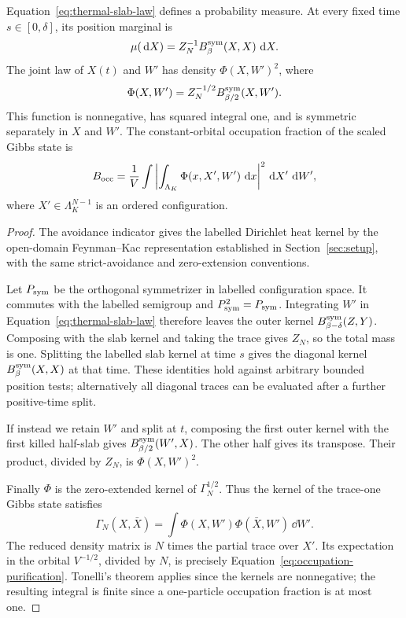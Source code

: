 \begin{proposition}\label{prop:purification}
Equation~\eqref{eq:thermal-slab-law} defines a probability measure.
At every fixed time $s\in[0,\delta]$, its position marginal is
\[
 \mu(\,\mathrm d X)=Z_N^{-1}B_\beta^{\rm sym}(X,X)\,\,\mathrm d X.
\]
The joint law of $X(t)$ and $W'$ has density $\Phi(X,W')^2$, where
\begin{equation}\label{eq:thermal-Phi}
 \Phi(X,W')=Z_N^{-1/2}B_{\beta/2}^{\rm sym}(X,W').
\end{equation}
This function is nonnegative, has squared integral one, and is
symmetric separately in $X$ and $W'$.  The constant-orbital
occupation fraction of the scaled Gibbs state is
\begin{equation}\label{eq:occupation-purification}
 B_{\rm occ}
 =\frac1V\int\left|\int_{\Lambda_K}
       \Phi(x,X',W')\,\,\mathrm d x\right|^2\,\mathrm d X'\,\,\mathrm d W',
\end{equation}
where $X'\in\Lambda_K^{N-1}$ is an ordered configuration.
\end{proposition}

\begin{proof}
The avoidance indicator gives the labelled Dirichlet heat kernel by
the open-domain Feynman--Kac representation established in
Section~\ref{sec:setup}, with the same strict-avoidance and zero-extension
conventions.

Let $P_{\rm sym}$ be the orthogonal symmetrizer in labelled
configuration space.  It commutes with the labelled semigroup and
$P_{\rm sym}^2=P_{\rm sym}$.  Integrating $W'$ in
Equation~\eqref{eq:thermal-slab-law} therefore leaves the outer
kernel $B_{\beta-\delta}^{\rm sym}(Z,Y)$.  Composing with the
slab kernel and taking the trace gives $Z_N$, so the total mass
is one.  Splitting the labelled slab kernel at time $s$ gives
the diagonal kernel $B_\beta^{\rm sym}(X,X)$ at that time.
These identities hold against arbitrary bounded position tests;
alternatively all diagonal traces can be evaluated after a further
positive-time split.

If instead we retain $W'$ and split at $t$, composing the first
outer kernel with the first killed half-slab gives
$B_{\beta/2}^{\rm sym}(W',X)$.  The other half gives its transpose.
Their product, divided by $Z_N$, is $\Phi(X,W')^2$.

Finally $\Phi$ is the zero-extended kernel of $\Gamma_N^{1/2}$.
Thus the kernel of the trace-one Gibbs state satisfies
\[
 \Gamma_N(X,\bar X)=\int
       \Phi(X,W')\Phi(\bar X,W')\,\dd W'.
\]
The reduced density matrix is $N$ times the partial trace over
$X'$.  Its expectation in the orbital $V^{-1/2}$, divided by $N$,
is precisely Equation~\eqref{eq:occupation-purification}.
Tonelli's theorem applies since the kernels are nonnegative;
the resulting integral is finite since a one-particle occupation
fraction is at most one.
\end{proof}

